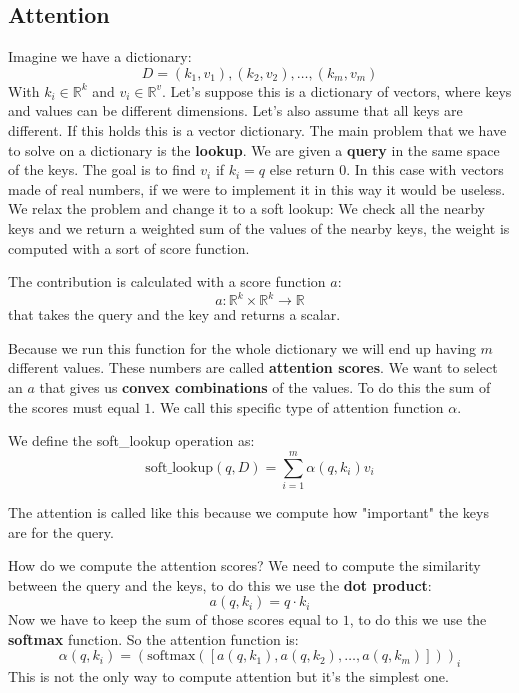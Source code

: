 \subsection{Attention}
\label{sec:attention}

Imagine we have a dictionary:
\[
    D={(k_1,v_1),(k_2,v_2),\ldots,(k_m,v_m)}
\]
With $k_i\in\mathbb{R}^{k}$ and $v_i\in\mathbb{R}^{v}$.
Let's suppose this is a dictionary of vectors, where keys and values can be different dimensions.
Let's also assume that all keys are different. If this holds this is a vector dictionary.
The main problem that we have to solve on a dictionary is the \textbf{lookup}. We are given a \textbf{query}
in the same space of the keys.
The goal is to find $v_i$ if $k_i=q$ else return $0$.
In this case with vectors made of real numbers, if we were to implement it in this way it would be useless.
We relax the problem and change it to a soft lookup:
We check all the nearby keys and we return a weighted sum of the values of the nearby keys, the weight is 
computed with a sort of score function.

The contribution is calculated with a score function $a$:
\[
    a:\mathbb{R}^{k}\times\mathbb{R}^{k}\rightarrow\mathbb{R}
\]
that takes the query and the key and returns a scalar.

Because we run this function for the whole dictionary we will end up having
$m$ different values.
These numbers are called \textbf{attention scores}.
We want to select an $a$ that gives us \textbf{convex combinations} of the values.
To do this the sum of the scores must equal $1$.
We call this specific type of attention function $\alpha$.

We define the soft\_lookup operation as:
\[
    \text{soft\_lookup}(q,D)=\sum_{i=1}^{m}\alpha(q,k_i)v_i
\]

The attention is called like this because we compute how "important" the keys are for the query.

How do we compute the attention scores? We need to compute the similarity between the query and the keys,
to do this we use the \textbf{dot product}:
\[
    a(q,k_i)=q\cdot k_i
\]
Now we have to keep the sum of those scores equal to $1$, to do this we use the \textbf{softmax} function.
So the attention function is:
\[
    \alpha(q,k_i)=\left(\text{softmax}([a(q,k_1),a(q,k_2),\ldots,a(q,k_m)])\right)_i
\]
This is not the only way to compute attention but it's the simplest one.

